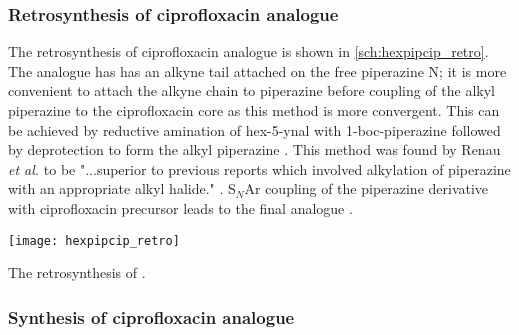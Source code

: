 \subsubsection{Retrosynthesis of ciprofloxacin analogue }

The retrosynthesis of ciprofloxacin analogue  is shown in \ref{sch:hexpipcip_retro}.
The analogue has has an alkyne tail attached on the free piperazine N; it is more convenient to attach the alkyne chain to piperazine before coupling of the alkyl piperazine  to the ciprofloxacin core  as this method is more convergent. This can be achieved by reductive amination of hex-5-ynal  with 1-boc-piperazine  followed by deprotection to form the alkyl piperazine . This method was found by Renau \textit{et al.} to be "...superior to previous reports which involved alkylation of piperazine with an appropriate alkyl halide." \cite{Renau1996,JPS:JPS2600571210}. 
S$_N$Ar coupling of the piperazine derivative with ciprofloxacin precursor  leads to the final analogue .

\begin{scheme}[H]
	\begin{center}
		\texttt{[image: hexpipcip\_retro]}
		\caption{The retrosynthesis of . \label{sch:hexpipcip_retro}}
	\end{center}
\end{scheme}

\subsubsection{Synthesis of ciprofloxacin analogue }

